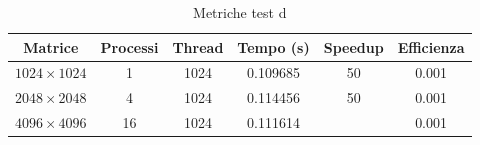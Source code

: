 \begin{table}[h]
    \centering
    \begin{tabular}{cccccc}
        \hline
        \textbf{Matrice}    & \textbf{Processi} & \textbf{Thread} & \textbf{Tempo (s)} & \textbf{Speedup} & \textbf{Efficienza} \\ \hline
        $1024 \times 1024 $ & 1                 & 1024            & 0.109685           & 50               & 0.001               \\
        $2048 \times 2048 $ & 4                 & 1024            & 0.114456           & 50               & 0.001               \\
        $4096 \times 4096 $ & 16                & 1024            & 0.111614           &                  & 0.001               \\ \hline
    \end{tabular}
    \caption{Metriche test d}
\end{table}

